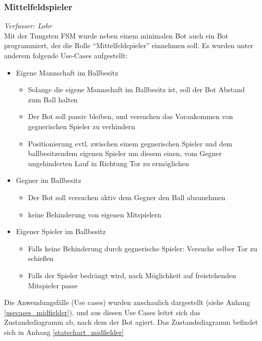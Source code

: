 \documentclass[fontsize=12pt,a4paper,final]{scrartcl}[2003/01/01]
\begin{document}
\subsubsection{Mittelfeldspieler}
\textit{Verfasser: Lohr}\\
Mit der Tungsten FSM wurde neben einem minimalen Bot auch ein Bot programmiert, der die Rolle ``Mittelfeldspieler'' einnehmen soll. Es wurden unter anderem folgende Use-Cases aufgestellt:

\begin{itemize}
 \item Eigene Mannschaft im Ballbesitz
 \begin{itemize}
  \item Solange die eigene Mannschaft im Ballbesitz ist, soll der Bot Abstand zum Ball halten
  \item Der Bot soll passiv bleiben, und versuchen das Vorankommen von gegnerischen Spieler zu verhindern
  \item Positionierung evtl. zwischen einem gegnerischen Spieler und dem ballbesitzendem eigenen Spieler um diesem einen, vom Gegner ungehinderten Lauf in Richtung Tor zu ermöglichen
 \end{itemize}
 
 \item Gegner im Ballbesitz
 \begin{itemize}
  \item Der Bot soll versuchen aktiv dem Gegner den Ball abzunehmen
  \item keine Behinderung von eigenen Mitspielern
 \end{itemize}
 
 \item Eigener Spieler im Ballbesitz
 \begin{itemize}
  \item Falls keine Behinderung durch gegnerische Spieler: Versuche selber Tor zu schießen
  \item Falls der Spieler bedrängt wird, nach Möglichkeit auf freistehenden Mitspieler passe
 \end{itemize}
\end{itemize}
Die Anwendungsfälle (Use cases) wurden anschaulich dargestellt (siehe Anhang \ref{usecases_midfielder}), und aus diesen Use Cases leitet sich das Zustandsdiagramm ab, nach dem der Bot agiert. Das Zustandsdiagramm befindet sich in Anhang \ref{statechart_midfielder}
\end{document}

